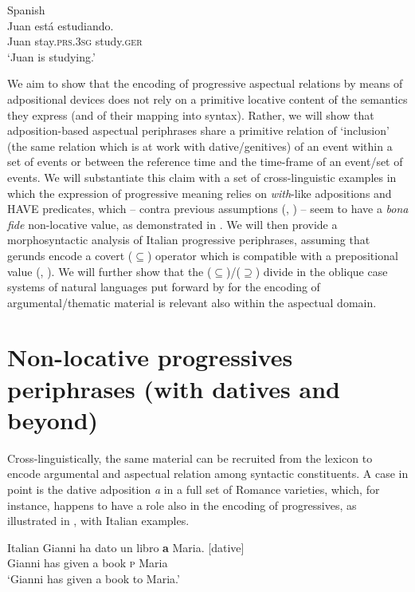 \documentclass[output=paper,modfonts,nonflat,newtxmath,colorlinks,citecolor=brown]{langsci/langscibook}
\begin{document}
     \ex Spanish\\\label{ex:franco:9b}
    \gll  Juan está estudiando.\\
        Juan stay.\textsc{prs.3sg} study.\textsc{ger}\\
    \glt `Juan is studying.'
    \z
    \z

We aim to show that the encoding of progressive aspectual relations by means of adpositional devices does not rely on a primitive locative content of the semantics they express (and of their mapping into syntax). Rather, we will show that adposition-based aspectual periphrases share a primitive relation of ‘inclusion’ (the same relation which is at work with dative/genitives) of an event within a set of events or between the reference time and the time-frame of an event/set of events. We will substantiate this claim with a set of cross-linguistic examples in which the expression of progressive meaning relies on \textit{with}{}-like adpositions and HAVE predicates, which -- contra previous assumptions (\citealt{Freeze1992}, \citealt{DenDikken1998}) -- seem to have a \textit{bona fide} non-locative value, as demonstrated in \citet{Levinson2011}. We will then provide a morphosyntactic analysis of Italian progressive periphrases, assuming that gerunds encode a covert (${\subseteq}$) operator which is compatible with a prepositional value (\citealt{Gallego2010}, \citealt{Franco2015}). We will further show that the (${\subseteq}$)/(${\supseteq}$) divide in the oblique case systems of natural languages put forward by \citet{FrancoManzini2017Ins} for the encoding of argumental/thematic material is relevant also within the aspectual domain.

\section{Non-locative progressives periphrases (with datives and beyond)}
\label{sec:franco:2}

Cross-linguistically, the same material can be recruited from the lexicon to encode argumental and aspectual relation among syntactic constituents. A case in point is the dative adposition \textit{a} in a full set of Romance varieties, which, for instance, happens to have a role also in the encoding of progressives, as illustrated in , with Italian examples.  

\ea%
    Italian\label{ex:franco:10}
    \ea \label{ex:franco:10a}
    \gll Gianni ha dato un libro \textbf{a} Maria. \hfill{[dative]}\\
        Gianni has given a book \textsc{p} Maria\\
    \glt ‘Gianni has given a book to Maria.’
    
\end{document}

